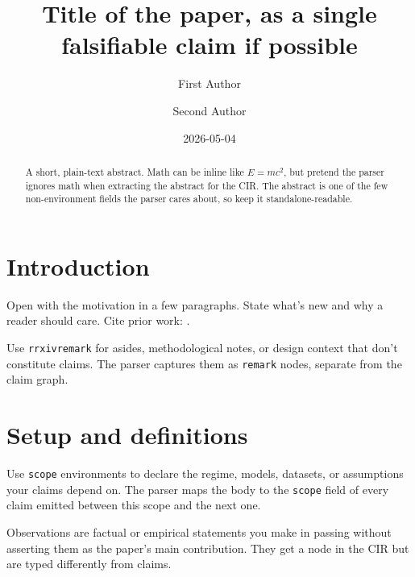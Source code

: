 \documentclass{rrxiv}
\title{Title of the paper, as a single falsifiable claim if possible}
\author[1]{First Author}
\author[2]{Second Author}
\affil[1]{Department of X, University Y}
\affil[2]{Independent}
\date{2026-05-04}
\begin{document}
\maketitle

\begin{abstract}
A short, plain-text abstract. Math can be inline like $E = mc^2$, but
pretend the parser ignores math when extracting the abstract for the CIR.
The abstract is one of the few non-environment fields the parser cares
about, so keep it standalone-readable.
\end{abstract}

\section{Introduction}
\label{sec:intro}

Open with the motivation in a few paragraphs. State what's new and why a
reader should care. Cite prior work: \cite{example-prior-work}.

\begin{rrxivremark}
\label{rem:context}
Use \texttt{rrxivremark} for asides, methodological notes, or design
context that don't constitute claims. The parser captures them as
\texttt{remark} nodes, separate from the claim graph.
\end{rrxivremark}

\section{Setup and definitions}
\label{sec:setup}

\begin{scope}
\label{scope:main}
Use \texttt{scope} environments to declare the regime, models, datasets,
or assumptions your claims depend on. The parser maps the body to the
\texttt{scope} field of every claim emitted between this scope and the
next one.
\end{scope}

\begin{observation}
\label{obs:setup}
Observations are factual or empirical statements you make in passing
without asserting them as the paper's main contribution. They get a
node in the CIR but are typed differently from claims.
\end{observation}
\end{document}
